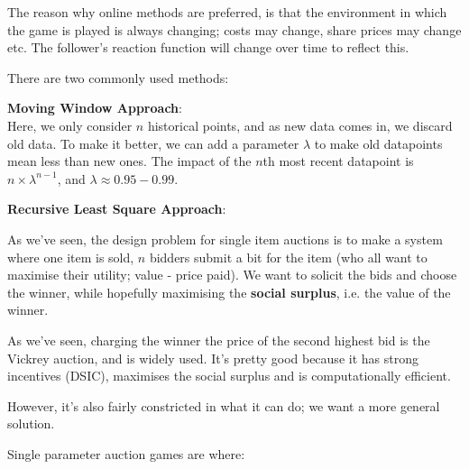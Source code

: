 The reason why online methods are preferred, is that the environment in which
the game is played is always changing; costs may change, share prices may change
etc. The follower's reaction function will change over time to reflect this.

There are two commonly used methods:

\begin{description}
  \item \textbf{Moving Window Approach}:\\
    Here, we only consider $n$ historical points, and as new data comes in, we
    discard old data.
    To make it better, we can add a parameter $\lambda$ to make old datapoints
    mean less than new ones. The impact of the $n$th most recent datapoint is
    $n \times \lambda ^{n-1}$, and $\lambda \approx 0.95-0.99$.
  \item \textbf{Recursive Least Square Approach}:\\
    
\end{description}





As we've seen, the design problem for single item auctions is to make a system
where one item is sold, $n$ bidders submit a bit for the item (who all want to
maximise their utility; value - price paid). We want to solicit the bids and
choose the winner, while hopefully maximising the \textbf{social surplus}, i.e.
the value of the winner.

As we've seen, charging the winner the price of the second highest bid is the
Vickrey auction, and is widely used. It's pretty good because it has strong
incentives (DSIC), maximises the social surplus and is computationally
efficient.

However, it's also fairly constricted in what it can do; we want a more general
solution.

Single parameter auction games are where:

